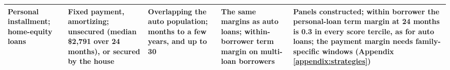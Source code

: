 \begin{tabularx}{0.96\textheight}{@{}>{\raggedright\arraybackslash}p{1.7cm}>{\raggedright\arraybackslash}X>{\raggedright\arraybackslash}X>{\raggedright\arraybackslash}X>{\raggedright\arraybackslash}X@{}}
Personal installment; home-equity loans & Fixed payment, amortizing; unsecured (median \$2,791 over 24 months), or secured by the house & Overlapping the auto population; months to a few years, and up to 30 & The same margins as auto loans; within-borrower term margin on multi-loan borrowers & Panels constructed; within borrower the personal-loan term margin at 24 months is 0.3 in every score tercile, as for auto loans; the payment margin needs family-specific windows (Appendix \ref{appendix:strategies}) \\
\bottomrule
\end{tabularx}
